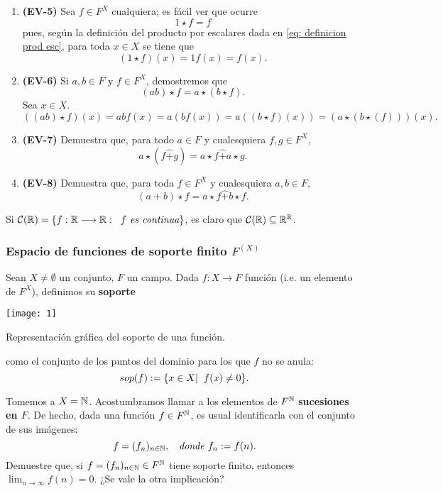 \begin{enumerate}
	\item \textbf{(EV-5)} Sea $f \in F^{X}$ cualquiera;
	es fácil ver que ocurre
	\[
	1 \star f = f
	\]
	pues, según la definición del producto por escalares dada en 
	\eqref{eq: definicion prod esc}, 
	para toda $x \in X$ se tiene que
	\[
	(1 \star f)(x) = 1 f(x) = f(x).
	\]
	\item \textbf{(EV-6)} Si $a, b \in F$
	y $f \in F^{X}$, demostremos que
	\[
	(ab) \star f = a \star (b \star f).
	\] 
	Sea $x \in X$.
	\[
	((ab) \star f)(x) = ab f(x) = a (bf(x))
	= a ((b \star f)(x)) = (a \star (b \star (f)))(x).
	\]
	\item \textbf{(EV-7)}
	 Demuestra que,
	para todo $a \in F$ y cualesquiera
	$f, g \in F^{X}$, 
	\[
	a \star (f \hat{+} g) = a \star f \hat{+} a \star g.
	\]
	
	\item \textbf{(EV-8)}
	 Demuestra que,
	para toda $f \in F^{X}$ y cualesquiera
	$a, b \in F$, 
	\[
	(a + b) \star f = a \star f \hat{+} b \star f.
	\]
	
\end{enumerate}

\begin{ejem}
Si $\mathcal{C}(\mathbb{R}) = \{ f: \mathbb{R} \longrightarrow \mathbb{R} :
\hspace{0.2cm} f \textit{ es continua} \}$,
es claro que 
$\mathcal{C}(\mathbb{R}) \subseteq \mathbb{R}^{\mathbb{R}}$.
\end{ejem}


\subsubsection{Espacio de funciones de soporte finito $F^{(X)}$}


\begin{defi}
Sean $X \neq \emptyset$ un conjunto, $F$ un campo. Dada
$f: X \longrightarrow F$ función (i.e. un elemento
de $F^{X}$), definimos su \textbf{soporte}
\begin{marginfigure}
\texttt{[image:  1]} 
		\caption{Representación gráfica del soporte de una función.}
\end{marginfigure}
como el conjunto de los puntos del dominio para 
los que $f$ no se anula:
\[
sop(f) :=
\{ x \in X  | \hspace{0.2cm} f(x) \neq 0 \}.
\]

\end{defi}

\begin{ejem}
Tomemos a $X = \mathbb{N}$. Acostumbramos llamar a los 
elementos de $F^{\mathbb{N}}$ \textbf{sucesiones en $F$}.
De hecho, dada una función $f \in F^{\mathbb{N}}$, 
es usual identificarla con el conjunto de sus imágenes:
\[
f = (f_{n})_{n \in \mathbb{N}}, 
\hspace{0.2cm} \textit{ donde }
f_{n} := f(n).
\]
 Demuestre que,
si $f = (f_{n})_{n \in \mathbb{N}} \in F ^{\mathbb{N}}$ tiene soporte 
finito, entonces $\lim_{n \rightarrow \infty} f(n) = 0$.
¿Se vale la otra implicación?
\diam
\end{ejem}


